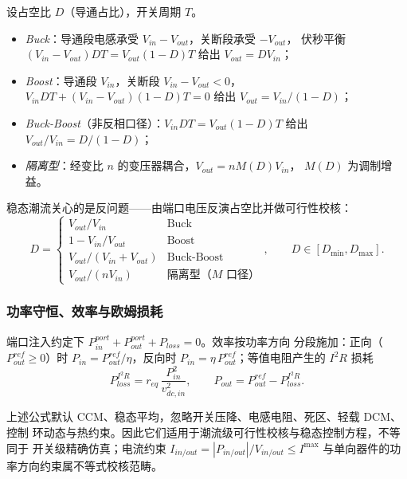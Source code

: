 \begin{example}[三种基本拓扑的电压律推导]
设占空比 $D$（导通占比），开关周期 $T$。
\begin{itemize}
  \item \emph{Buck}：导通段电感承受 $V_{in}-V_{out}$，关断段承受 $-V_{out}$，
        伏秒平衡 $(V_{in}-V_{out})DT=V_{out}(1-D)T$ 给出
        $V_{out}=DV_{in}$；
  \item \emph{Boost}：导通段 $V_{in}$，关断段 $V_{in}-V_{out}<0$，
        $V_{in}DT+(V_{in}-V_{out})(1-D)T=0$ 给出
        $V_{out}=V_{in}/(1-D)$；
  \item \emph{Buck-Boost}（非反相口径）：$V_{in}DT=V_{out}(1-D)T$ 给出
        $V_{out}/V_{in}=D/(1-D)$；
  \item \emph{隔离型}：经变比 $n$ 的变压器耦合，$V_{out}=nM(D)V_{in}$，
        $M(D)$ 为调制增益。
\end{itemize}
\end{example}

稳态潮流关心的是反问题——由端口电压反演占空比并做可行性校核：
\begin{equation}
D=\begin{cases}
V_{out}/V_{in} & \text{Buck}\\
1-V_{in}/V_{out} & \text{Boost}\\
V_{out}/(V_{in}+V_{out}) & \text{Buck-Boost}\\
V_{out}/(nV_{in}) & \text{隔离型（}M\text{ 口径）}
\end{cases},
\qquad D\in[D_{\min},D_{\max}].
\end{equation}

\subsubsection{功率守恒、效率与欧姆损耗}
端口注入约定下 $P_{in}^{port}+P_{out}^{port}+P_{loss}=0$。效率按功率方向
分段施加：正向（$P_{out}^{ref}\ge0$）时 $P_{in}=P_{out}^{ref}/\eta$，反向时
$P_{in}=\eta\,P_{out}^{ref}$；等值电阻产生的 $I^{2}R$ 损耗
\begin{equation}
P_{loss}^{I^2R}=r_{eq}\,\frac{P_{in}^{2}}{v_{dc,in}^{2}},\qquad
P_{out}=P_{out}^{ref}-P_{loss}^{I^2R}.
\end{equation}

\begin{remark}[平均模型的适用边界]
上述公式默认 CCM、稳态平均，忽略开关压降、电感电阻、死区、轻载 DCM、控制
环动态与热约束。因此它们适用于潮流级可行性校核与稳态控制方程，不等同于
开关级精确仿真；电流约束 $I_{in/out}=|P_{in/out}|/V_{in/out}\le I^{\max}$
与单向器件的功率方向约束属不等式校核范畴。
\end{remark}

